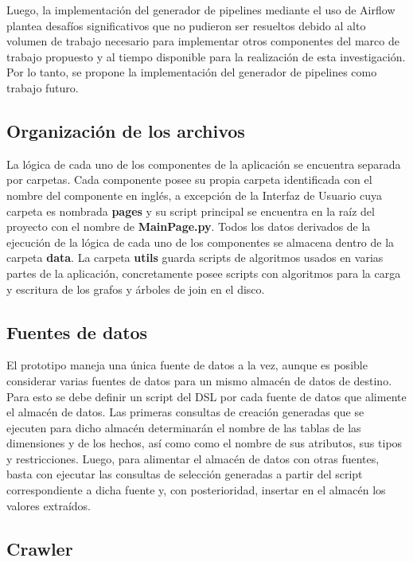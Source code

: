 Luego, la implementación del generador de pipelines mediante el uso de Airflow plantea desafíos significativos que 
no pudieron ser resueltos debido al alto volumen de trabajo necesario para implementar otros componentes del marco 
de trabajo propuesto y al tiempo disponible para la realización de esta investigación. Por lo tanto, se propone 
la implementación del generador de pipelines como trabajo futuro.

\subsection{Organización de los archivos}

La lógica de cada uno de los componentes de la aplicación se encuentra separada por carpetas. Cada componente 
posee su propia carpeta identificada con el nombre del componente en inglés, a excepción de la Interfaz de Usuario 
cuya carpeta es nombrada \textbf{pages} y su script principal se encuentra en la raíz del proyecto con el nombre de 
\textbf{MainPage.py}. Todos los datos derivados de la ejecución de la lógica de cada uno de los componentes 
se almacena dentro de la carpeta \textbf{data}. La carpeta \textbf{utils} guarda scripts de algoritmos usados 
en varias partes de la aplicación, concretamente posee scripts con algoritmos para la carga y escritura de los 
grafos y \'arboles de join en el disco.

\subsection{Fuentes de datos}

El prototipo maneja una única fuente de datos a la vez, aunque es posible considerar varias 
fuentes de datos para un mismo almacén de datos de destino. Para esto se debe definir un script del DSL por 
cada fuente de datos que alimente el almacén de datos. Las primeras consultas de creación generadas que se ejecuten 
para dicho almacén determinarán el nombre de las tablas de las dimensiones y de los hechos, as\'i como 
como el nombre de sus atributos, sus tipos y restricciones. Luego, para alimentar el almacén de datos con otras 
fuentes, basta con ejecutar las consultas de selección generadas a partir del script correspondiente a 
dicha fuente y, con posterioridad, insertar en el almacén los valores extra\'idos.

\subsection{Crawler}

